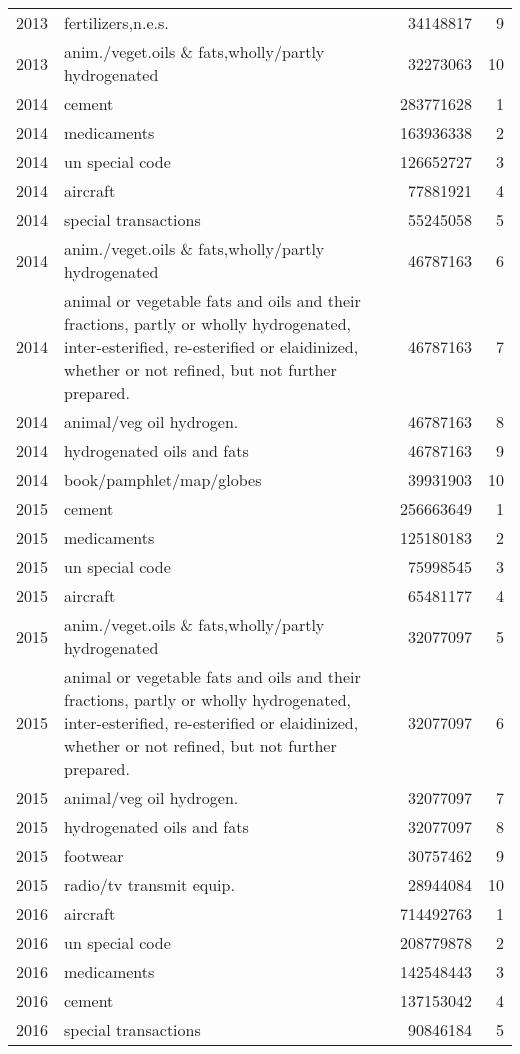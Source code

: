 \begin{longtable}{rlrr}
2013 & fertilizers,n.e.s. & 34148817 & 9 \\ 
2013 & anim./veget.oils \& fats,wholly/partly hydrogenated & 32273063 & 10 \\ 
2014 & cement & 283771628 & 1 \\ 
2014 & medicaments & 163936338 & 2 \\ 
2014 & un special code & 126652727 & 3 \\ 
2014 & aircraft & 77881921 & 4 \\ 
2014 & special transactions & 55245058 & 5 \\ 
2014 & anim./veget.oils \& fats,wholly/partly hydrogenated & 46787163 & 6 \\ 
2014 & animal or vegetable fats and oils and their fractions, partly or wholly hydrogenated, inter-esterified, re-esterified or elaidinized, whether or not refined, but not further prepared. & 46787163 & 7 \\ 
2014 & animal/veg oil hydrogen. & 46787163 & 8 \\ 
2014 & hydrogenated oils and fats & 46787163 & 9 \\ 
2014 & book/pamphlet/map/globes & 39931903 & 10 \\ 
2015 & cement & 256663649 & 1 \\ 
2015 & medicaments & 125180183 & 2 \\ 
2015 & un special code & 75998545 & 3 \\ 
2015 & aircraft & 65481177 & 4 \\ 
2015 & anim./veget.oils \& fats,wholly/partly hydrogenated & 32077097 & 5 \\ 
2015 & animal or vegetable fats and oils and their fractions, partly or wholly hydrogenated, inter-esterified, re-esterified or elaidinized, whether or not refined, but not further prepared. & 32077097 & 6 \\ 
2015 & animal/veg oil hydrogen. & 32077097 & 7 \\ 
2015 & hydrogenated oils and fats & 32077097 & 8 \\ 
2015 & footwear & 30757462 & 9 \\ 
2015 & radio/tv transmit equip. & 28944084 & 10 \\ 
2016 & aircraft & 714492763 & 1 \\ 
2016 & un special code & 208779878 & 2 \\ 
2016 & medicaments & 142548443 & 3 \\ 
2016 & cement & 137153042 & 4 \\ 
2016 & special transactions & 90846184 & 5 \\ 

\end{longtable}
